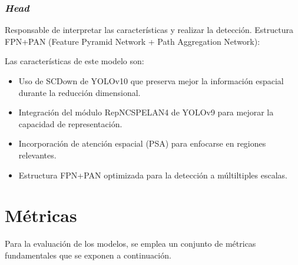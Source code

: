 \documentclass[12pt,a4paper,onecolumn,oneside]{report}
\begin{document}
\subsubsection{\textit{Head}}
Responsable de interpretar las características y realizar la detección. Estructura FPN+PAN (Feature Pyramid Network + Path Aggregation Network):

\begin{table}[H]
\caption{Estructura del \textit{head} del modelo personalizado}
\centering
{}
\end{table}

Las características de este modelo son:
\begin{itemize}
  \item Uso de SCDown de YOLOv10 que preserva mejor la información espacial durante la reducción dimensional.
  \item Integración del módulo RepNCSPELAN4 de YOLOv9 para mejorar la capacidad de representación.
  \item Incorporación de atención espacial (PSA) para enfocarse en regiones relevantes.
  \item Estructura FPN+PAN optimizada para la detección a múltiltiples escalas.
\end{itemize}

\section{Métricas}
\label{sec:Métricas}
Para la evaluación de los modelos, se emplea un conjunto de métricas fundamentales que se exponen a continuación.
\end{document}
